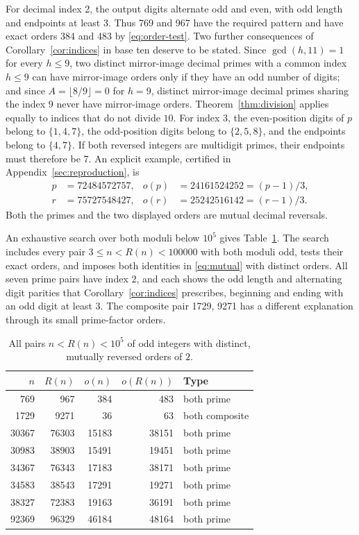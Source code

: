 \documentclass[11pt]{amsart}
\theoremstyle{remark}\newtheorem{remark}[theorem]{Remark}
\newcommand{\rev}{R}
\begin{document}
For decimal index 2, the output digits alternate odd and even, with odd length and endpoints at least 3.
Thus 769 and 967 have the required pattern and have exact orders 384 and 483 by \eqref{eq:order-test}.
Two further consequences of Corollary~\ref{cor:indices} in base ten deserve to be stated. Since $\gcd(h,11)=1$ for every $h\le9$, two distinct mirror-image decimal primes with a common index $h\le9$ can have mirror-image orders only if they have an odd number of digits; and since $A=\lfloor8/9\rfloor=0$ for $h=9$, distinct mirror-image decimal primes sharing the index $9$ never have mirror-image orders.
Theorem~\ref{thm:division} applies equally to indices that do not divide $10$.
For index 3, the even-position digits of $p$ belong to $\{1,4,7\}$, the odd-position digits belong to $\{2,5,8\}$, and the endpoints belong to $\{4,7\}$.
If both reversed integers are multidigit primes, their endpoints must therefore be 7.
An explicit example, certified in Appendix~\ref{sec:reproduction}, is
\begin{equation}\label{eq:index-three}
 \begin{aligned}
 p&=72484572757,& o(p)&=24161524252=(p-1)/3,\\
 r&=75727548427,& o(r)&=25242516142=(r-1)/3.
 \end{aligned}
\end{equation}
Both the primes and the two displayed orders are mutual decimal reversals.

An exhaustive search over both moduli below $10^5$ gives
Table~\ref{tab:small}. The search includes every pair
$3\le n<\rev(n)<100000$ with both moduli odd, tests their exact
orders, and imposes both identities in \eqref{eq:mutual} with
distinct orders. All seven prime pairs have index $2$, and each shows
the odd length and alternating digit parities that
Corollary~\ref{cor:indices} prescribes, beginning and ending with an
odd digit at least $3$. The composite pair 1729, 9271 has a different
explanation through its small prime-factor orders.

\begin{table}[!htbp]\centering\small
\caption{All pairs $n<R(n)<10^5$ of odd integers with distinct, mutually reversed orders of $2$.}
\label{tab:small}
\begin{tabular}{rrrrl}
\toprule
$n$&$\rev(n)$&$o(n)$&$o(\rev(n))$&Type\\\midrule
769&967&384&483&both prime\\
1729&9271&36&63&both composite\\
30367&76303&15183&38151&both prime\\
30983&38903&15491&19451&both prime\\
34367&76343&17183&38171&both prime\\
34583&38543&17291&19271&both prime\\
38327&72383&19163&36191&both prime\\
92369&96329&46184&48164&both prime\\
\bottomrule\end{tabular}
\end{table}
\end{document}
